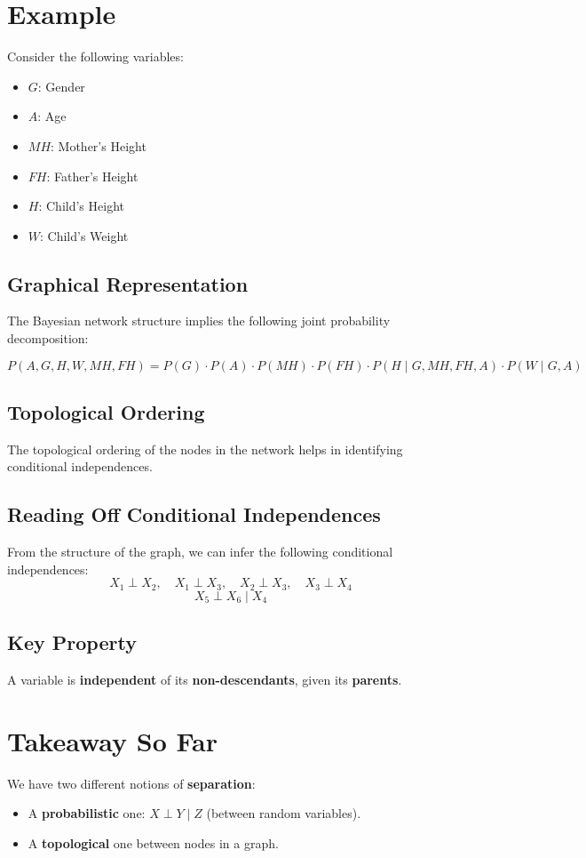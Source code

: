 \documentclass{article}%
\begin{document}
\section*{Example}
Consider the following variables:
\begin{itemize}
    \item \( G \): Gender
    \item \( A \): Age
    \item \( MH \): Mother’s Height
    \item \( FH \): Father’s Height
    \item \( H \): Child’s Height
    \item \( W \): Child’s Weight
\end{itemize}

\subsection*{Graphical Representation}
The Bayesian network structure implies the following joint probability decomposition:

\[
P(A, G, H, W, MH, FH) = P(G) \cdot P(A) \cdot P(MH) \cdot P(FH) \cdot P(H \mid G, MH, FH, A) \cdot P(W \mid G, A)
\]

\subsection*{Topological Ordering}
The topological ordering of the nodes in the network helps in identifying conditional independences.

\subsection*{Reading Off Conditional Independences}
From the structure of the graph, we can infer the following conditional independences:
\[
X_1 \perp X_2, \quad X_1 \perp X_3, \quad X_2 \perp X_3, \quad X_3 \perp X_4
\]
\[
X_5 \perp X_6 \mid X_4
\]

\subsection*{Key Property}
A variable is \textbf{independent} of its \textbf{non-descendants}, given its \textbf{parents}.
\section*{Takeaway So Far}
We have two different notions of \textbf{separation}:
\begin{itemize}
    \item A \textbf{probabilistic} one: \( X \perp Y \mid Z \) (between random variables).
    \item A \textbf{topological} one between nodes in a graph.
\end{itemize}
\end{document}
